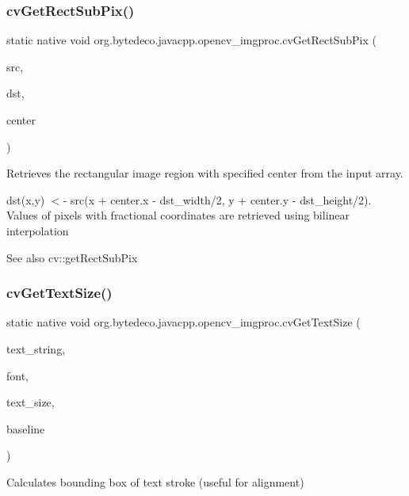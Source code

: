 \subsubsection{\texorpdfstring{cv\+Get\+Rect\+Sub\+Pix()}{cvGetRectSubPix()}}
{\footnotesize\ttfamily static native void org.\+bytedeco.\+javacpp.\+opencv\+\_\+imgproc.\+cv\+Get\+Rect\+Sub\+Pix (\begin{DoxyParamCaption}\item[{@Const Cv\+Arr}]{src,  }\item[{Cv\+Arr}]{dst,  }\item[{@By\+Val Cv\+Point2\+D32f}]{center }\end{DoxyParamCaption})\hspace{0.3cm}{\ttfamily [static]}}



Retrieves the rectangular image region with specified center from the input array. 

dst(x,y) $<$-\/ src(x + center.\+x -\/ dst\+\_\+width/2, y + center.\+y -\/ dst\+\_\+height/2). Values of pixels with fractional coordinates are retrieved using bilinear interpolation \begin{DoxySeeAlso}{See also}
cv\+::get\+Rect\+Sub\+Pix 
\end{DoxySeeAlso}
\mbox{\label{group__imgproc__c_gaadcbbe95eaad71798726cedfd442c08f}} 
\subsubsection{\texorpdfstring{cv\+Get\+Text\+Size()}{cvGetTextSize()}}
{\footnotesize\ttfamily static native void org.\+bytedeco.\+javacpp.\+opencv\+\_\+imgproc.\+cv\+Get\+Text\+Size (\begin{DoxyParamCaption}\item[{@Cast(\char`\"{}const char$\ast$\char`\"{}) Byte\+Pointer}]{text\+\_\+string,  }\item[{@Const Cv\+Font}]{font,  }\item[{Cv\+Size}]{text\+\_\+size,  }\item[{Int\+Pointer}]{baseline }\end{DoxyParamCaption})\hspace{0.3cm}{\ttfamily [static]}}



Calculates bounding box of text stroke (useful for alignment) 

